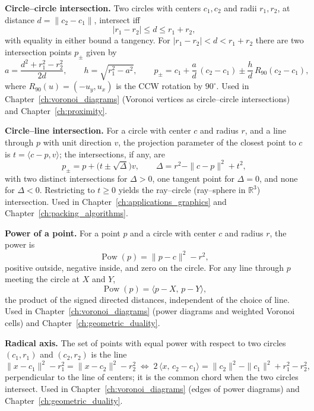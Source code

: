 \medskip\noindent\textbf{Circle--circle intersection.}
Two circles with centers $c_1, c_2$ and radii $r_1, r_2$, at distance
$d = \|c_2 - c_1\|$, intersect iff
\[
  |r_1 - r_2| \le d \le r_1 + r_2,
\]
with equality in either bound a tangency. For $|r_1 - r_2| < d < r_1 + r_2$
there are two intersection points $p_\pm$ given by
\[
  a = \frac{d^2 + r_1^2 - r_2^2}{2d},
  \qquad
  h = \sqrt{r_1^2 - a^2},
  \qquad
  p_\pm = c_1 + \frac{a}{d}\,(c_2 - c_1) \pm \frac{h}{d}\,R_{90}(c_2 - c_1),
\]
where $R_{90}(u) = (-u_y, u_x)$ is the CCW rotation by $90^\circ$. Used in
Chapter~\ref{ch:voronoi_diagrams} (Voronoi vertices as circle--circle
intersections) and Chapter~\ref{ch:proximity}.

\medskip\noindent\textbf{Circle--line intersection.}
For a circle with center $c$ and radius $r$, and a line through $p$ with
unit direction $v$, the projection parameter of the closest point to $c$
is $t = \langle c - p, v\rangle$; the intersections, if any, are
\[
  p_\pm = p + \bigl(t \pm \sqrt{\Delta}\bigr) v,
  \qquad
  \Delta = r^2 - \|c - p\|^2 + t^2,
\]
with two distinct intersections for $\Delta > 0$, one tangent point for
$\Delta = 0$, and none for $\Delta < 0$. Restricting to $t \ge 0$ yields the
ray--circle (ray--sphere in $\mathbb{R}^3$) intersection. Used in
Chapter~\ref{ch:applications_graphics} and Chapter~\ref{ch:packing_algorithms}.

\medskip\noindent\textbf{Power of a point.}
For a point $p$ and a circle with center $c$ and radius $r$, the power is
\[
  \operatorname{Pow}(p) = \|p - c\|^2 - r^2,
\]
positive outside, negative inside, and zero on the circle. For any line
through $p$ meeting the circle at $X$ and $Y$,
\[
  \operatorname{Pow}(p) = \langle p - X,\, p - Y\rangle,
\]
the product of the signed directed distances, independent of the choice of
line. Used in Chapter~\ref{ch:voronoi_diagrams} (power diagrams and
weighted Voronoi cells) and Chapter~\ref{ch:geometric_duality}.

\medskip\noindent\textbf{Radical axis.}
The set of points with equal power with respect to two circles
$(c_1, r_1)$ and $(c_2, r_2)$ is the line
\[
  \|x - c_1\|^2 - r_1^2 = \|x - c_2\|^2 - r_2^2
  \;\Longleftrightarrow\;
  2\,\langle x,\, c_2 - c_1\rangle = \|c_2\|^2 - \|c_1\|^2 + r_1^2 - r_2^2,
\]
perpendicular to the line of centers; it is the common chord when the two
circles intersect. Used in Chapter~\ref{ch:voronoi_diagrams} (edges of
power diagrams) and Chapter~\ref{ch:geometric_duality}.


